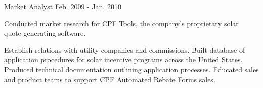 \begin{cventries}

\cventry
{Market Analyst} %
{} %
{} %
{Feb. 2009 - Jan. 2010} %
{ %
\begin{cvitems}
	\item {Conducted market research for CPF Tools, the company’s proprietary solar quote-generating software.}
	\item {Establish relations with utility companies and commissions. Built database of application procedures for solar incentive programs across the United States. Produced technical documentation outlining application processes. Educated sales and product teams to support CPF Automated Rebate Forms sales.}
\end{cvitems}
}

\end{cventries}
